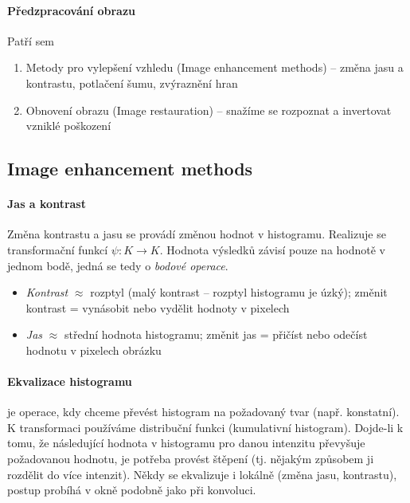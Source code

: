
\paragraph{Předzpracování obrazu}

Patří sem
\begin{enumerate}
\item Metody pro vylepšení vzhledu (Image enhancement methods) -- změna jasu a kontrastu, potlačení šumu, zvýraznění hran
\item Obnovení obrazu (Image restauration) -- snažíme se rozpoznat a invertovat vzniklé poškození
\end{enumerate}

\subsection{Image enhancement methods} 
\paragraph{Jas a kontrast}
Změna kontrastu a jasu se provádí změnou hodnot v histogramu. Realizuje se transformační funkcí $\psi:K\rightarrow K$.
Hodnota výsledků závisí pouze na hodnotě v jednom bodě, jedná se tedy o \emph{bodové operace}.
\begin{itemize}
	\item \emph{Kontrast} $ \approx $ rozptyl (malý kontrast -- rozptyl histogramu je úzký); změnit kontrast = vynásobit nebo vydělit hodnoty v pixelech
	\item \emph{Jas} $ \approx $ střední hodnota histogramu; změnit jas = přičíst nebo odečíst hodnotu v pixelech obrázku
\end{itemize}


\paragraph{Ekvalizace histogramu} je operace, kdy chceme převést histogram na požadovaný tvar (např. konstatní). K transformaci používáme distribuční funkci (kumulativní histogram). Dojde-li k tomu, že následující hodnota v histogramu pro danou intenzitu převyšuje požadovanou hodnotu, je potřeba provést štěpení (tj. nějakým způsobem ji rozdělit do více intenzit). Někdy se ekvalizuje i lokálně (změna jasu, kontrastu), postup probíhá v okně podobně jako při konvoluci.

